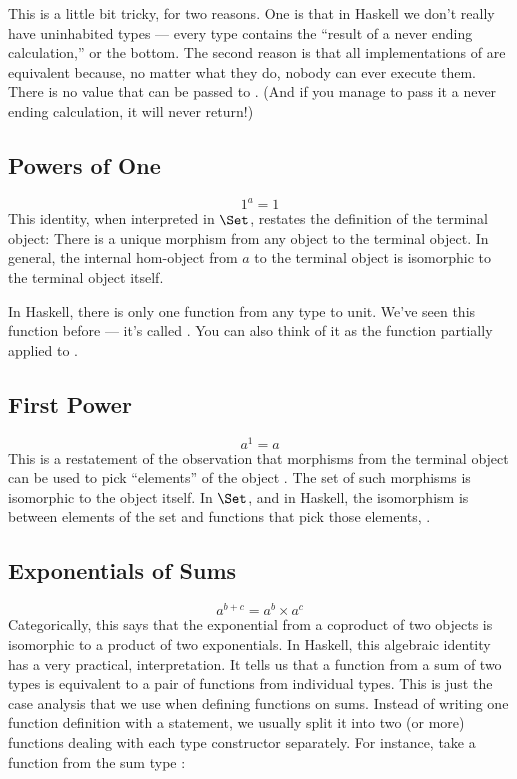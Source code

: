 This is a little bit tricky, for two reasons. One is that in Haskell we
don't really have uninhabited types --- every type contains the ``result
of a never ending calculation,'' or the bottom. The second reason is
that all implementations of  are equivalent because, no
matter what they do, nobody can ever execute them. There is no value
that can be passed to . (And if you manage to pass it a
never ending calculation, it will never return!)

\subsection{Powers of One}

\[1^{a} = 1\]
This identity, when interpreted in $\Set$, restates the definition
of the terminal object: There is a unique morphism from any object to
the terminal object. In general, the internal hom-object from $a$
to the terminal object is isomorphic to the terminal object itself.

In Haskell, there is only one function from any type  to unit.
We've seen this function before --- it's called . You can
also think of it as the function  partially applied to
\code{()}.

\subsection{First Power}

\[a^{1} = a\]
This is a restatement of the observation that morphisms from the
terminal object can be used to pick ``elements'' of the object
. The set of such morphisms is isomorphic to the object
itself. In $\Set$, and in Haskell, the isomorphism is between
elements of the set  and functions that pick those elements,
.

\subsection{Exponentials of Sums}

\[a^{b+c} = a^{b} \times a^{c}\]
Categorically, this says that the exponential from a coproduct of two
objects is isomorphic to a product of two exponentials. In Haskell, this
algebraic identity has a very practical, interpretation. It tells us
that a function from a sum of two types is equivalent to a pair of
functions from individual types. This is just the case analysis that we
use when defining functions on sums. Instead of writing one function
definition with a  statement, we usually split it into two
(or more) functions dealing with each type constructor separately. For
instance, take a function from the sum type
:

